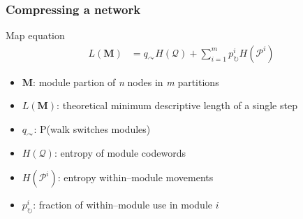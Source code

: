 \documentclass{beamer}
\begin{document}
\begin{frame}
  \frametitle{Compressing a network}

  \begin{block}{Map equation \tiny{}}
    \begin{align*}
      L(\textbf{M}) &= q_{\curvearrowright}H(\mathcal{Q}) + \sum^{m}_{i = 1} p^{i}_{\circlearrowright}H(\mathcal{P}^{i})
    \end{align*}

    \begin{itemize}
      \item \(\textbf{M}\): module partion of \textit{n} nodes in \textit{m} partitions
      \item \(L(\textbf{M})\): theoretical minimum descriptive length of a single step
      \item \(q_{\curvearrowright}\): P(walk switches modules)
      \item \(H(\mathcal{Q})\): entropy of module codewords
      \item \(H(\mathcal{P}^{i})\): entropy within--module movements
      \item \(p^{i}_{\circlearrowright}\): fraction of within--module use in module \(i\)
    \end{itemize}
  \end{block}
\end{frame}
\end{document}
